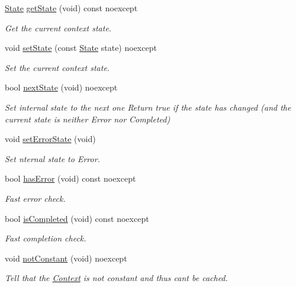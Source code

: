 \begin{DoxyCompactItemize}
\mbox{\hyperlink{namespaceo_z_a356b278f7c65def0cae75fca8cae268e}{State}} \mbox{\hyperlink{classo_z_1_1_context_af912acc5fa475aa1e835a71df1752ef5}{get\+State}} (void) const noexcept
\begin{DoxyCompactList}\small\item\em Get the current context\textquotesingle{} state. \end{DoxyCompactList}\item 
void \mbox{\hyperlink{classo_z_1_1_context_aa71b839188393f2328ad9f9c5da08004}{set\+State}} (const \mbox{\hyperlink{namespaceo_z_a356b278f7c65def0cae75fca8cae268e}{State}} state) noexcept
\begin{DoxyCompactList}\small\item\em Set the current context\textquotesingle{} state. \end{DoxyCompactList}\item 
bool \mbox{\hyperlink{classo_z_1_1_context_aa07d51de7059b3a4fc9e3505704a33be}{next\+State}} (void) noexcept
\begin{DoxyCompactList}\small\item\em Set internal state to the next one Return true if the state has changed (and the current state is neither Error nor Completed) \end{DoxyCompactList}\item 
void \mbox{\hyperlink{classo_z_1_1_context_a036d993634650ee8414c2f12d49d0204}{set\+Error\+State}} (void)
\begin{DoxyCompactList}\small\item\em Set nternal state to Error. \end{DoxyCompactList}\item 
bool \mbox{\hyperlink{classo_z_1_1_context_a53afdf1400b5ec8429b09da40662a34d}{has\+Error}} (void) const noexcept
\begin{DoxyCompactList}\small\item\em Fast error check. \end{DoxyCompactList}\item 
bool \mbox{\hyperlink{classo_z_1_1_context_ac5dd957a1f76f466b86a179ed3146967}{is\+Completed}} (void) const noexcept
\begin{DoxyCompactList}\small\item\em Fast completion check. \end{DoxyCompactList}\item 
void \mbox{\hyperlink{classo_z_1_1_context_ada521ec57fbc2febfd61177e8bbc0128}{not\+Constant}} (void) noexcept
\begin{DoxyCompactList}\small\item\em Tell that the \mbox{\hyperlink{classo_z_1_1_context}{Context}} is not constant and thus can\textquotesingle{}t be cached. \end{DoxyCompactList}\item 

\end{DoxyCompactItemize}
